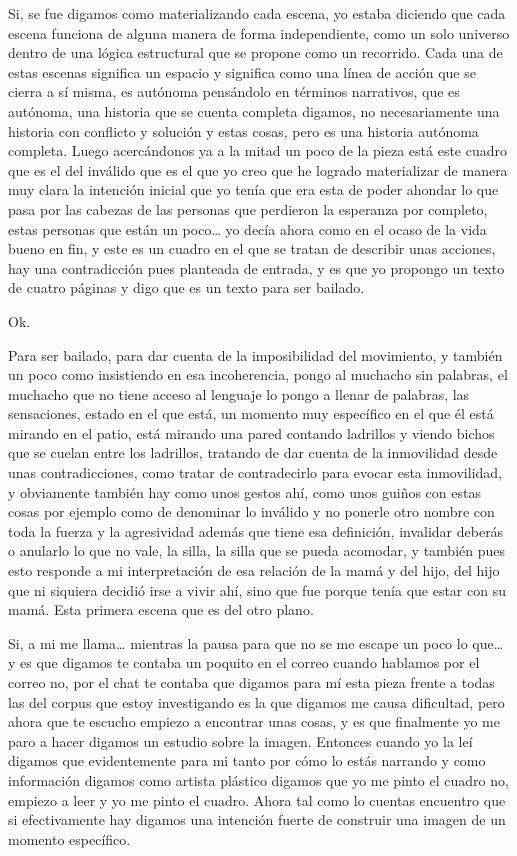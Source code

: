 Si, se fue digamos como materializando cada escena, yo estaba diciendo que cada escena funciona de alguna manera de forma independiente, como un solo universo dentro de una lógica estructural que se propone como un recorrido.
Cada una de estas escenas significa un espacio y  significa como una línea de acción que se cierra a sí misma, es autónoma pensándolo en términos narrativos, que es autónoma, una historia que se cuenta completa digamos, no necesariamente una historia con conflicto y solución y estas cosas, pero es una historia autónoma completa. Luego acercándonos ya a la mitad un poco de la pieza está este cuadro que es el del inválido que es el que yo creo que he logrado materializar de manera muy clara la intención inicial que yo tenía que era esta de poder ahondar lo que pasa por las cabezas de las personas que perdieron la esperanza por completo, estas personas que están un poco… yo decía ahora como en el ocaso de la vida bueno en fin, y este es un cuadro en el que se tratan de describir unas acciones, hay una contradicción pues planteada de entrada, y es que yo propongo un texto de cuatro páginas y digo que es un texto para ser bailado.

Ok.

Para ser bailado, para dar cuenta de la imposibilidad del  movimiento, y también un poco como insistiendo en esa incoherencia, pongo al muchacho sin palabras, el muchacho que no tiene acceso al lenguaje lo pongo a llenar de palabras, las sensaciones, estado en el que está, un momento muy específico en el que él está mirando en el patio, está mirando una pared contando ladrillos y viendo bichos que se cuelan entre los ladrillos, tratando de dar cuenta de la inmovilidad desde unas contradicciones, como tratar de contradecirlo para evocar esta inmovilidad, y obviamente también hay como unos gestos ahí, como unos guiños con estas cosas por ejemplo como de denominar lo inválido y no ponerle otro nombre con toda la fuerza y la agresividad además que tiene esa definición, invalidar deberás o anularlo lo que no vale, la silla, la silla que se pueda acomodar, y también pues esto responde a mi interpretación de esa relación de la mamá y del hijo, del hijo que ni siquiera decidió irse a vivir ahí, sino que fue porque tenía que estar con su mamá.
Esta primera escena que es del otro plano.


Si, a mi me llama… mientras la pausa para que no se me escape un poco lo que… y es que digamos te contaba un poquito en el correo cuando hablamos por el correo no, por el chat te contaba que digamos para mí esta pieza frente a todas las del corpus que estoy investigando es la que digamos me causa dificultad, pero ahora que te escucho empiezo a encontrar unas cosas, y es que finalmente yo me paro a hacer digamos un estudio sobre la imagen. 
Entonces cuando yo la leí digamos que evidentemente para mi tanto por cómo lo estás narrando y como información digamos como artista plástico digamos que yo me pinto el cuadro no, empiezo a leer y yo me pinto el cuadro. Ahora tal como lo cuentas encuentro que si efectivamente hay digamos una intención fuerte de construir una imagen de un momento específico.


